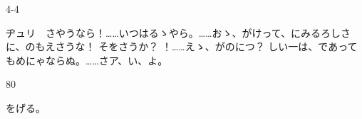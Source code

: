 \documentclass[tate,paper=b6j,jafontsize=9pt]{jlreq}
\begin{document}
\begin{azconvIndented}{4\zw}{-4\zw}

ヂュリ　さやうなら！……いつはるゝやら。……おゝ、がけって、にみるろしさに、のもえさうな！ そをさうか？ ！……えゝ、がのにつ？ しい一は、であってもめにゃならぬ。……さア、い、よ。

\end{azconvIndented}
\begin{azconvIndented}{8\zw}{0\zw}

をげる。

\end{azconvIndented}
\end{document}
